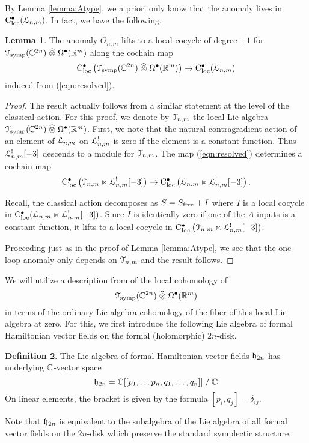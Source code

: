 \documentclass[11pt, oneside, reqno]{amsart}
\theoremstyle{definition} \newtheorem{definition}{Definition}[section]
\newtheorem{lemma}[definition]{Lemma}
\theoremstyle{definition}
\theoremstyle{remark}
\theoremstyle{definition} \newtheorem{remark}[definition]{Remark}
\theoremstyle{definition} \newtheorem{remarks}[definition]{Remarks}
\theoremstyle{definition} \newtheorem{question}[definition]{Question}
\theoremstyle{definition} \newtheorem*{note}{Note}
\theoremstyle{definition} \newtheorem{example}[definition]{Example}
\theoremstyle{definition} \newtheorem{examples}[definition]{Examples}
\def\cloc{{\rm C}_{\rm loc}}
\def\bu{\bullet}
\def\Hat{\widehat}
\newcommand{\ham}{/\!\!/}
\def\ham{\fh}
\begin{document}
By Lemma \ref{lemma:Atype}, we a priori only know that the anomaly lives in $\cloc^\bu(\cL_{n,m})$. 
In fact, we have the following.

\begin{lemma} \label{symp_vf_lemma}
The anomaly $\Theta_{n,m}$ lifts to a local cocycle of degree $+1$ for $\cT_{\rm symp}(\CC^{2n}) \; \Hat{\otimes} \; \Omega^{\bu}(\RR^m)$ along the cochain map
\[
\cloc^\bu\left(\cT_{\rm symp}(\CC^{2n}) \; \Hat{\otimes} \; \Omega^{\bu}(\RR^m)\right) \to \cloc^\bu(\cL_{n,m})
\]
induced from (\ref{eqn:resolved}). 
\end{lemma}

\begin{proof}
The result actually follows from a similar statement at the level of the classical action. 
For this proof, we denote by $\mathcal T_{n,m}$ the local Lie algebra $\cT_{\rm symp}(\CC^{2n}) \; \Hat{\otimes} \; \Omega^{\bu}(\RR^m)$.
First, we note that the natural contragradient action of an element of $\mathcal L_{n,m}$ on $\mathcal L^!_{n,m}$ is zero if the element is a constant function. 
Thus $\mathcal L^!_{n,m} [-3]$ descends to a module for $\mathcal T_{n,m}$. 
The map (\ref{eqn:resolved}) determines a cochain map
\[
\cloc^\bu \left(\cT_{n,m} \ltimes \cL_{n,m}^! [-3] \right) \to \cloc^\bu \left(\cL_{n,m} \ltimes \cL_{n,m}^![-3]\right) .
\]

Recall, the classical action decomposes as $S = S_{\rm free} + I$ where $I$ is a local cocycle in $\cloc^\bu (\cL_{n,m} \ltimes \cL_{n,m}^![-3])$. 
Since $I$ is identically zero if one of the $A$-inputs is a constant function, it lifts to a local cocycle in $\cloc^\bu \left(\cT_{n,m} \ltimes \cL_{n,m}^! [-3] \right)$. 

Proceeding just as in the proof of Lemma \ref{lemma:Atype}, we see that the one-loop anomaly only depends on $\mathcal T_{n,m}$ and the result follows. 
\end{proof}

We will utilize a description from \cite{BWgf} of the local cohomology of 
\[
\cT_{\rm symp}(\CC^{2n}) \; \Hat{\otimes} \; \Omega^{\bu}(\RR^m)
\]
in terms of the ordinary Lie algebra cohomology of the fiber of this local Lie algebra at zero. 
For this, we first introduce the following Lie algebra of formal Hamiltonian vector fields on the formal (holomorphic) $2n$-disk. 


\begin{definition}
The Lie algebra of formal Hamiltonian vector fields $\ham_{2n}$ has underlying $\mathbb C$-vector space
\[
\ham_{2n} = \CC[[p_1, \ldots p_n, q_1, \ldots, q_n]] \; / \; \CC 
\]
On linear elements, the bracket is given by the formula $[p_i, q_j] = \delta_{ij}$. 
\end{definition}
Note that $\ham_{2n}$ is equivalent to the subalgebra of the Lie algebra of all formal vector fields on the $2n$-disk which preserve the standard symplectic structure.
\end{document}
